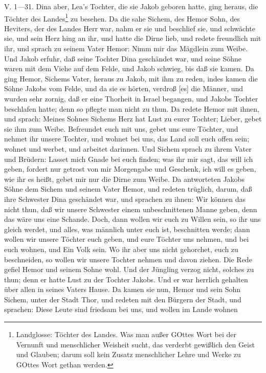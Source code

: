 V. 1—31. Dina aber, Lea’s Tochter, die sie Jakob geboren hatte, ging heraus, die Töchter des Landes\footnote{Landglosse: Töchter des Landes. Was man außer GOttes Wort bei der Vernunft und menschlicher Weisheit sucht, das verderbt gewißlich den Geist und Glauben; darum soll kein Zusatz menschlicher Lehre und Werke zu GOttes Wort gethan werden.} zu besehen. Da die sahe Sichem, des Hemor Sohn, des Heviters, der des Landes Herr war, nahm er sie und beschlief sie, und schwächte sie, und sein Herz hing an ihr, und hatte die Dirne lieb, und redete freundlich mit ihr, und sprach zu seinem Vater Hemor: Nimm mir das Mägdlein zum Weibe. Und Jakob erfuhr, daß seine Tochter Dina geschändet war, und seine Söhne waren mit dem Viehe auf dem Felde, und Jakob schwieg, bis daß sie kamen. Da ging Hemor, Sichems Vater, heraus zu Jakob, mit ihm zu reden, indes kamen die Söhne Jakobs vom Felde, und da sie es hörten, verdroß [es] die Männer, und wurden sehr zornig, daß er eine Thorheit in Israel begangen, und Jakobs Tochter beschlafen hatte; denn so pflegte man nicht zu thun. Da redete Hemor mit ihnen, und sprach: Meines Sohnes Sichems Herz hat Lust zu eurer Tochter; Lieber, gebet sie ihm zum Weibe. Befreundet euch mit uns, gebet uns eure Töchter, und nehmet ihr unsere Tochter, und wohnet bei uns, das Land soll euch offen sein; wohnet und werbet, und arbeitet darinnen. Und Sichem sprach zu ihrem Vater und Brüdern: Lasset mich Gnade bei euch finden; was ihr mir sagt, das will ich geben, fordert nur getrost von mir Morgengabe und Geschenk, ich will es geben, wie ihr es heißt, gebet mir nur die Dirne zum Weibe. Da antworteten Jakobs Söhne dem Sichem und seinem Vater Hemor, und redeten trüglich, darum, daß ihre Schwester Dina geschändet war, und sprachen zu ihnen: Wir können das nicht thun, daß wir unsere Schwester einem unbeschnittenen Manne geben, denn das wäre uns eine Schande. Doch, dann wollen wir euch zu Willen sein, so ihr uns gleich werdet, und alles, was männlich unter euch ist, beschnitten werde; dann wollen wir unsere Töchter euch geben, und eure Töchter uns nehmen, und bei euch wohnen, und Ein Volk sein. Wo ihr aber uns nicht gehorchet, euch zu beschneiden, so wollen wir unsere Tochter nehmen und davon ziehen. Die Rede gefiel Hemor und seinem Sohne wohl. Und der Jüngling verzog nicht, solches zu thun; denn er hatte Lust zu der Tochter Jakobs. Und er war herrlich gehalten über allen in seines Vaters Hause. Da kamen sie nun, Hemor und sein Sohn Sichem, unter der Stadt Thor, und redeten mit den Bürgern der Stadt, und sprachen: Diese Leute sind friedsam bei uns, und wollen im Lande wohnen

